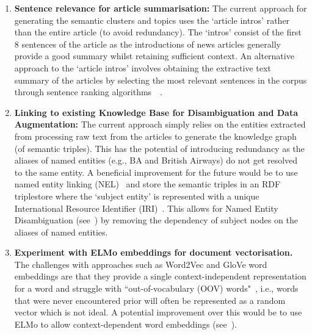 \begin{enumerate}
    \item \textbf{Sentence relevance for article summarisation:} The current approach for generating the semantic clusters and topics uses the `article intros' rather than the entire article (to avoid redundancy). The `intros' consist of the first 8 sentences of the article as the introductions of news articles generally provide a good summary whilst retaining sufficient context. An alternative approach to the `article intros' involves obtaining the extractive text summary of the articles by selecting the most relevant sentences in the corpus through sentence ranking algorithms~\cite{jevzek2008automatic}~\cite{madhuri2019extractive}. 
    
    \item \textbf{Linking to existing Knowledge Base for Disambiguation and Data Augmentation:} The current approach simply relies on the entities extracted from processing raw text from the articles to generate the knowledge graph (of semantic triples). This has the potential of introducing redundancy as the aliases of named entities (e.g., BA and British Airways) do not get resolved to the same entity. A beneficial improvement for the future would be to use named entity linking (NEL)~\cite{retrospective_kg} and store the semantic triples in an RDF triplestore where the `subject entity' is represented with a unique International Resource Identifier (IRI)~\cite{internationalized}. This allows for Named Entity Disambiguation (see~) by removing the dependency of subject nodes on the aliases of named entities. 
    
    \item \textbf{Experiment with ELMo embeddings for document vectorisation.}  The challenges with approaches such as Word2Vec and GloVe word embeddings are that they provide a single context-independent representation for a word and struggle with ``out-of-vocabulary (OOV) words"~\cite{elmo_word_rep}, i.e., words that were never encountered prior will often be represented as a random vector which is not ideal. A potential improvement over this would be to use ELMo to allow context-dependent word embeddings (see~).
    
\end{enumerate}
